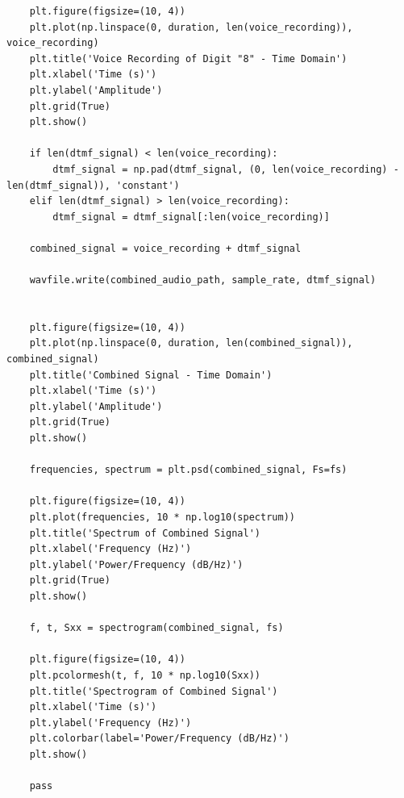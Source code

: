 \documentclass[letterpaper, 12pt]{article}
\begin{document}
\begin{lstlisting}
    plt.figure(figsize=(10, 4))
    plt.plot(np.linspace(0, duration, len(voice_recording)), voice_recording)
    plt.title('Voice Recording of Digit "8" - Time Domain')
    plt.xlabel('Time (s)')
    plt.ylabel('Amplitude')
    plt.grid(True)
    plt.show()

    if len(dtmf_signal) < len(voice_recording):
        dtmf_signal = np.pad(dtmf_signal, (0, len(voice_recording) - len(dtmf_signal)), 'constant')
    elif len(dtmf_signal) > len(voice_recording):
        dtmf_signal = dtmf_signal[:len(voice_recording)]

    combined_signal = voice_recording + dtmf_signal

    wavfile.write(combined_audio_path, sample_rate, dtmf_signal)


    plt.figure(figsize=(10, 4))
    plt.plot(np.linspace(0, duration, len(combined_signal)), combined_signal)
    plt.title('Combined Signal - Time Domain')
    plt.xlabel('Time (s)')
    plt.ylabel('Amplitude')
    plt.grid(True)
    plt.show()

    frequencies, spectrum = plt.psd(combined_signal, Fs=fs)

    plt.figure(figsize=(10, 4))
    plt.plot(frequencies, 10 * np.log10(spectrum))
    plt.title('Spectrum of Combined Signal')
    plt.xlabel('Frequency (Hz)')
    plt.ylabel('Power/Frequency (dB/Hz)')
    plt.grid(True)
    plt.show()

    f, t, Sxx = spectrogram(combined_signal, fs)

    plt.figure(figsize=(10, 4))
    plt.pcolormesh(t, f, 10 * np.log10(Sxx))
    plt.title('Spectrogram of Combined Signal')
    plt.xlabel('Time (s)')
    plt.ylabel('Frequency (Hz)')
    plt.colorbar(label='Power/Frequency (dB/Hz)')
    plt.show()

    pass

\end{lstlisting}
\end{document}
